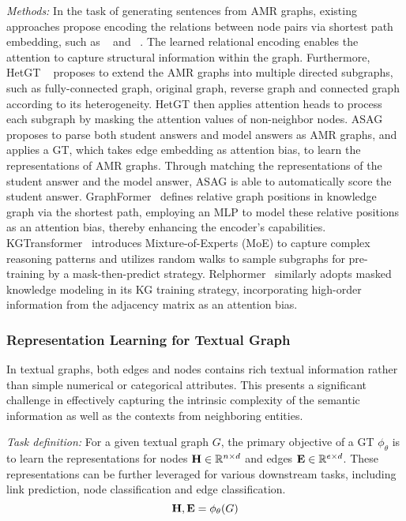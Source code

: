\textit{Methods:} In the task of generating sentences from AMR graphs, existing approaches propose encoding the relations between node pairs via shortest path embedding, such as ~\cite{zhu-etal-2019-modeling} and ~\cite{cai-lam-2020-graph}. The learned relational encoding enables the attention to capture structural information within the graph. Furthermore, HetGT ~\cite{yao-etal-2020-heterogeneous} proposes to extend the AMR graphs into multiple directed subgraphs, such as fully-connected graph, original graph, reverse graph and connected graph according to its heterogeneity. HetGT then applies attention heads to process each subgraph by masking the attention values of non-neighbor nodes. ASAG~\cite{agarwal2022multi} proposes to parse both student answers and model answers as AMR graphs, and applies a GT, which takes edge embedding as attention bias, to learn the representations of AMR graphs. Through matching the representations of the student answer and the model answer, ASAG is able to automatically score the student answer.
GraphFormer~\cite{yang2021graphformers} defines relative graph positions in knowledge graph via the shortest path, employing an MLP to model these relative positions as an attention bias, thereby enhancing the encoder's capabilities. KGTransformer~\cite{kgtransformer} introduces Mixture-of-Experts (MoE) to capture complex reasoning patterns and utilizes random walks to sample subgraphs for pre-training by  a mask-then-predict strategy. Relphormer~\cite{Relphormer} similarly adopts masked knowledge modeling in its KG training strategy, incorporating high-order information from the adjacency matrix as an attention bias.



\subsubsection{\textbf{Representation Learning for Textual Graph}}
In textual graphs, both edges and nodes contains rich textual information rather than simple numerical or categorical attributes. This presents a significant challenge in effectively capturing the intrinsic complexity of the semantic information as well as the contexts from neighboring entities.


\textit{Task definition:} For a given textual graph $G$, the primary objective of a GT $\phi_{\theta}$ is to learn the representations for nodes $\mathbf{H} \in \mathbb{R}^{n \times d}$ and edges $\mathbf{E} \in \mathbb{R}^{e \times d}$. These representations can be further leveraged for various downstream tasks, including link prediction, node classification and edge classification.
\begin{equation}
    \mathbf{H}, \mathbf{E} = \phi_{\theta}(G)
\end{equation}

